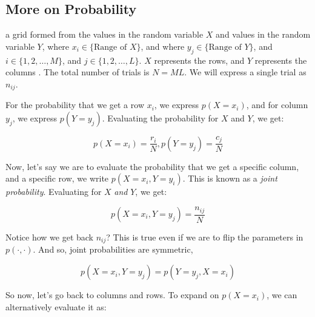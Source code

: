 \documentclass{tufte-handout}
\begin{document}
\subsection{More on Probability}

 a grid formed from the values in the random variable $X$ and values in the random variable $Y$, where $x_i \in \{\text{Range of } X\}$, and where $y_j \in \{\text{Range of } Y\}$, and $i \in \{ 1, 2, \ldots, M \}$, and $j \in \{ 1, 2, \ldots, L \}$. $X$ represents the rows, and $Y$ represents the columns . The total number of trials is $N = ML$. We will express a single trial as $n_{ij}$.

For the probability that we get a row $x_i$, we express $p(X = x_i)$, and for column $y_j$, we express $p(Y = y_j)$. Evaluating the probability for $X$ and $Y$, we get:

\begin{equation} \label{equation:probbasic}
  p(X = x_i) = \frac{r_i}{N}, p(Y = y_j) = \frac{c_j}{N}
\end{equation}


Now, let's say we are to evaluate the probability that we get a specific column, and a specific row, we write $p(X = x_i, Y = y_i)$. This is known as a \emph{joint probability}. Evaluating for $X$ \emph{and} $Y$, we get:

\begin{equation} \label{equation:jointprob}
  p(X = x_i, Y = y_j) = \frac{n_{ij}}{N}
\end{equation}

Notice how we get back $n_{ij}$? This is true even if we are to flip the parameters in $p(\cdot, \cdot)$. And so, joint probabilities are symmetric,

\begin{equation}\label{equation:probabilitysymmetry}
  p(X = x_i, Y = y_j) = p(Y = y_j, X = x_i)
\end{equation}

So now, let's go back to columns and rows. To expand on $p(X = x_i)$, we can alternatively evaluate it as:
\end{document}
